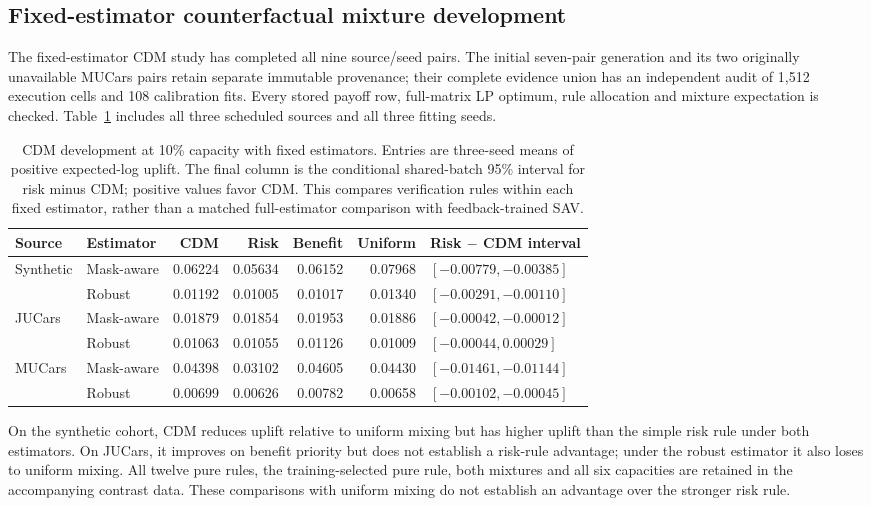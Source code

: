\subsection{Fixed-estimator counterfactual mixture development}
The fixed-estimator CDM study has completed all nine source/seed pairs.
The initial seven-pair generation and its two originally unavailable MUCars
pairs retain separate immutable provenance; their complete evidence union
has an independent audit of 1,512 execution cells and 108 calibration fits.
Every stored payoff row, full-matrix LP optimum, rule allocation and mixture
expectation is checked. Table~\ref{tab:cdm_development} includes all three
scheduled sources and all three fitting seeds.

\begin{table}[t]
\centering
\caption{CDM development at 10\% capacity with fixed estimators. Entries are
three-seed means of positive expected-log uplift. The final column is the
conditional shared-batch 95\% interval for risk minus CDM; positive values
favor CDM. This compares verification rules within each fixed estimator,
rather than a matched full-estimator comparison with feedback-trained SAV.}
\label{tab:cdm_development}
\begin{tabular}{llrrrrl}
\toprule
Source & Estimator & CDM & Risk & Benefit & Uniform & Risk $-$ CDM interval\\
\midrule
Synthetic & Mask-aware & 0.06224 & 0.05634 & 0.06152 & 0.07968 & $[-0.00779,-0.00385]$\\
 & Robust & 0.01192 & 0.01005 & 0.01017 & 0.01340 & $[-0.00291,-0.00110]$\\
\midrule
JUCars & Mask-aware & 0.01879 & 0.01854 & 0.01953 & 0.01886 & $[-0.00042,-0.00012]$\\
 & Robust & 0.01063 & 0.01055 & 0.01126 & 0.01009 & $[-0.00044,0.00029]$\\
\midrule
MUCars & Mask-aware & 0.04398 & 0.03102 & 0.04605 & 0.04430 & $[-0.01461,-0.01144]$\\
 & Robust & 0.00699 & 0.00626 & 0.00782 & 0.00658 & $[-0.00102,-0.00045]$\\
\bottomrule
\end{tabular}
\end{table}

On the synthetic cohort, CDM reduces uplift relative to uniform mixing but
has higher uplift than the simple risk rule under both estimators. On JUCars,
it improves on benefit priority but does not establish a risk-rule advantage;
under the robust estimator it also loses to uniform mixing. All twelve pure
rules, the training-selected pure rule, both mixtures and all six capacities
are retained in the accompanying contrast data. These comparisons with uniform mixing do not establish an advantage
over the stronger risk rule.

